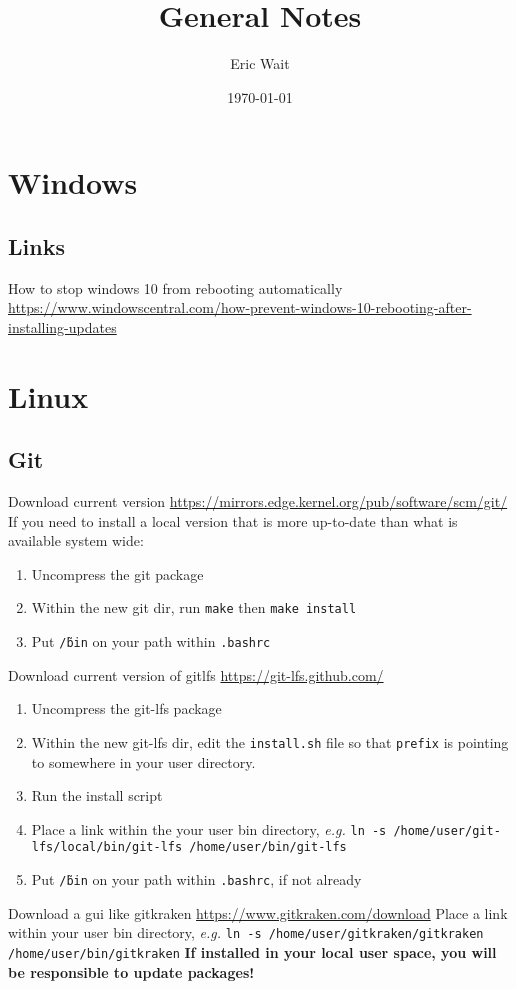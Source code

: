 \documentclass[11pt,spacing=single]{article}
\author{Eric Wait}
\title{General Notes}
\date{\today}
\newcommand{\eg}[1]{\textit{e.g.} {#1}}
\begin{document}
	\maketitle
	\newpage

	\listoftodos
	\newpage

	\section{Windows}
		\subsection*{Links}
			How to stop windows 10 from rebooting automatically \href{https://www.windowscentral.com/how-prevent-windows-10-rebooting-after-installing-updates}{https://www.windowscentral.com/how-prevent-windows-10-rebooting-after-installing-updates}

	\section{Linux}
		\subsection*{Git}
			Download current version \href{https://mirrors.edge.kernel.org/pub/software/scm/git/}{https://mirrors.edge.kernel.org/pub/software/scm/git/}
			If you need to install a local version that is more up-to-date than what is available system wide:
			\begin{enumerate}
				\item Uncompress the git package
				\item Within the new git dir, run \texttt{make} then \texttt{make install}
				\item Put \texttt{\~/bin} on your path within \texttt{.bashrc}
			\end{enumerate}
			Download current version of gitlfs \href{https://git-lfs.github.com/}{https://git-lfs.github.com/}
			\begin{enumerate}
				\item Uncompress the git-lfs package
				\item Within the new git-lfs dir, edit the \texttt{install.sh} file so that \texttt{prefix} is pointing to somewhere in your user directory.
				\item Run the install script
				\item Place a link within the your user bin directory, \eg{\texttt{ln -s /home/user/git-lfs/local/bin/git-lfs /home/user/bin/git-lfs}}
				\item Put \texttt{\~/bin} on your path within \texttt{.bashrc}, if not already
			\end{enumerate}
			Download a gui like gitkraken \href{https://www.gitkraken.com/download}{https://www.gitkraken.com/download}
			Place a link within your user bin directory, \eg{\texttt{ln -s /home/user/gitkraken/gitkraken /home/user/bin/gitkraken}}
			\textbf{\color{red} If installed in your local user space, you will be responsible to update packages!}
\end{document}
